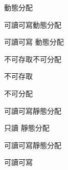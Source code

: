 \bTABLE

\bTABLEhead
\bTR
\bTD \eTD
\bTD{}\eTD \bTD{}\eTD
\bTD{}\eTD \bTD{}\eTD
\eTR
\eTABLEhead

\bTABLEbody
\bTR
\bTD{}\eTD
\bTD 動態分配\par 可讀可寫\eTD \bTD 動態分配\par 可讀可寫\eTD
\bTD 動態分配\par 不可存取\eTD \bTD 不可分配\par 不可存取\eTD
\eTR

\bTR
\bTD{}\eTD
\bTD 不可分配\par 可讀可寫\eTD \bTD 靜態分配\par 只讀\eTD
\bTD 靜態分配\par 可讀可寫\eTD \bTD 靜態分配\par 可讀可寫\eTD
\eTR
\eTABLEbody

\eTABLE

